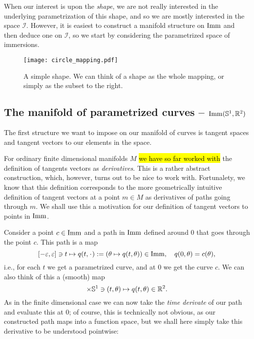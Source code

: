When our interest is upon the \textit{shape}, we are not really interested in the underlying parametrization of this shape, and so we are mostly interested in the space $\mathcal{I}$. However, it is easiest to construct a manifold structure on $\mathop{}\!\mathrm{Imm}$ and then deduce one on $\mathcal{I}$, so we start by considering the parametrized space of immersions.

\begin{figure}
  \centerline{\texttt{[image: circle\_mapping.pdf]}}
  \caption{A simple shape. We can think of a shape as the whole
    mapping, or simply as the subset to the right.}
  \label{fig:circle-mapping}
\end{figure}

\subsection{The manifold of parametrized curves -- $\mathop{}\!\mathrm{Imm}(\mathbb{S}^1, \mathbb{R}^2)$}
\label{sec:parametrized-curves}

The first structure we want to impose on our manifold of curves is tangent spaces and tangent vectors to our elements in the space.

For ordinary finite dimensional manifolds $M$ \hl{we have so far worked with} the definition of tangents vectors as \textit{derivatives}. This is a rather abstract construction, which, however, turns out to be nice to work with. Fortunalety, we know that this definition corresponds to the more geometrically intuitive definition of tangent vectors at a point $m \in M$ as derivatives of paths going through $m$. We shall use this a motivation for our definition of tangent vectors to points in $\mathop{}\!\mathrm{Imm}$.

Consider a point $c\in \mathop{}\!\mathrm{Imm}$ and a path in $\mathop{}\!\mathrm{Imm}$ defined around $0$ that goes through the point $c$. This path is a map
\begin{equation}
  \label{eq:path-in-imm}
  [-\epsilon, \epsilon] \ni t \mapsto  q(t, \blank) :=  (\theta\mapsto q(t, \theta)) \in \I,
  \quad q(0,\theta) = c(\theta),
\end{equation}
i.e., for each $t$ we get a parametrized curve, and at 0 we get the curve $c$. We can also think of this a (smooth) map
\begin{equation*}
  [-\epsilon, \epsilon] \times \S^1  \ni (t, \theta) \mapsto q(t, \theta) \in \R^2.
\end{equation*}
As in the finite dimensional case we can now take the \textit{time derivate} of our path and evaluate this at 0; of course, this is technically not obvious, as our constructed path maps into a function space, but we shall here simply take this derivative to be understood pointwise:

